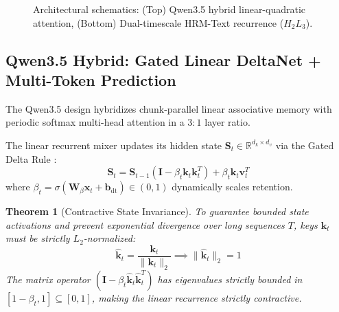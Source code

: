 \documentclass[11pt,a4paper]{article}
\newtheorem{theorem}{Theorem}
\begin{document}
\begin{figure}[t]
\caption{Architectural schematics: (Top) Qwen3.5 hybrid linear-quadratic attention, (Bottom) Dual-timescale HRM-Text recurrence ($H_2L_3$).}
\label{fig:architecture_schematics}
\end{figure}

\subsection{Qwen3.5 Hybrid: Gated Linear DeltaNet + Multi-Token Prediction}

The Qwen3.5 design \cite{qwen2025} hybridizes chunk-parallel linear associative memory with periodic softmax multi-head attention in a $3:1$ layer ratio.

The linear recurrent mixer updates its hidden state $\mathbf{S}_t \in \mathbb{R}^{d_k \times d_v}$ via the Gated Delta Rule \cite{yang2024gated}:
\begin{equation}
\mathbf{S}_t = \mathbf{S}_{t-1} (\mathbf{I} - \beta_t \mathbf{k}_t \mathbf{k}_t^T) + \beta_t \mathbf{k}_t \mathbf{v}_t^T
\label{eq:delta_rule}
\end{equation}
where $\beta_t = \sigma(\mathbf{W}_\beta \mathbf{x}_t + \mathbf{b}_{\text{dt}}) \in (0, 1)$ dynamically scales retention.

\begin{theorem}[Contractive State Invariance]
To guarantee bounded state activations and prevent exponential divergence over long sequences $T$, keys $\mathbf{k}_t$ must be strictly $L_2$-normalized:
\begin{equation}
\hat{\mathbf{k}}_t = \frac{\mathbf{k}_t}{\|\mathbf{k}_t\|_2} \implies \|\hat{\mathbf{k}}_t\|_2 = 1
\end{equation}
The matrix operator $(\mathbf{I} - \beta_t \hat{\mathbf{k}}_t \hat{\mathbf{k}}_t^T)$ has eigenvalues strictly bounded in $[1 - \beta_t, 1] \subseteq [0, 1]$, making the linear recurrence strictly contractive.
\end{theorem}
\end{document}
